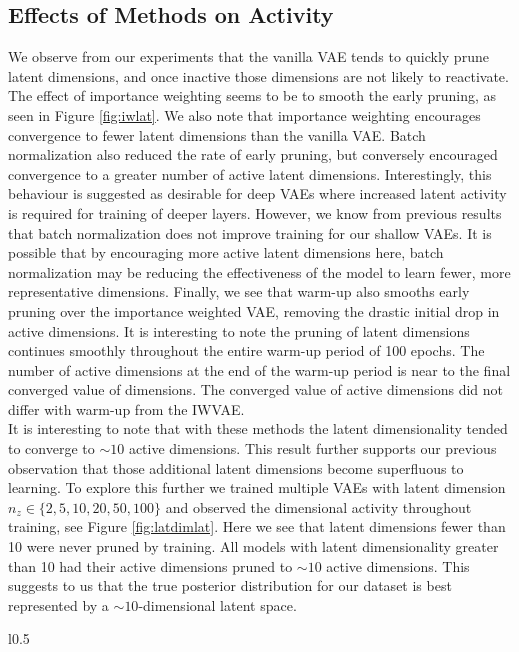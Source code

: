 \documentclass{article} %
\numberwithin{figure}{section}
\begin{document}
\subsection{Effects of Methods on Activity}
We observe from our experiments that the vanilla VAE tends to quickly prune latent dimensions, and once inactive those dimensions are not likely to reactivate. The effect of importance weighting seems to be to smooth the early pruning, as seen in Figure \ref{fig:iwlat}. We also note that importance weighting encourages convergence to fewer latent dimensions than the vanilla VAE. Batch normalization also reduced the rate of early pruning, but conversely encouraged convergence to a greater number of active latent dimensions. Interestingly, this behaviour is suggested as desirable for deep VAEs where increased latent activity is required for training of deeper layers. However, we know from previous results that batch normalization does not improve training for our shallow VAEs. It is possible that by encouraging more active latent dimensions here, batch normalization may be reducing the effectiveness of the model to learn fewer, more representative dimensions. Finally, we see that warm-up also smooths early pruning over the importance weighted VAE, removing the drastic initial drop in active dimensions. It is interesting to note the pruning of latent dimensions continues smoothly throughout the entire warm-up period of 100 epochs. The number of active dimensions at the end of the warm-up period is near to the final converged value of dimensions. The converged value of active dimensions did not differ with warm-up from the IWVAE.\\
It is interesting to note that with these methods the latent dimensionality tended to converge to $\sim 10$ active dimensions. This result further supports our previous observation that those additional latent dimensions become superfluous to learning. To explore this further we trained multiple VAEs with latent dimension $n_z \in \{2,5,10,20,50,100\}$ and observed the dimensional activity throughout training, see Figure \ref{fig:latdimlat}. Here we see that latent dimensions fewer than 10 were never pruned by training. All models with latent dimensionality greater than 10 had their active dimensions pruned to $\sim 10$ active dimensions. This suggests to us that the true posterior distribution for our dataset is best represented by a $\sim 10$-dimensional latent space. 

\begin{wrapfigure}{l}{0.5\textwidth}
  \resizebox{\linewidth}{!}{}
  \caption{Effect of Latent Dimensionality}
  \label{fig:latdimlat}
\end{wrapfigure}
\end{document}
